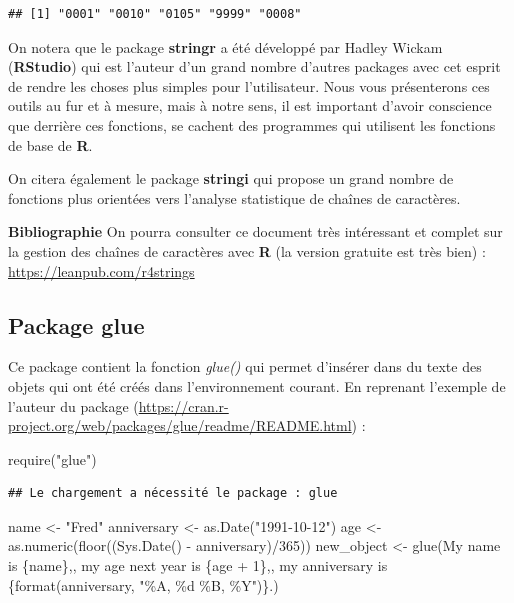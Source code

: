 \documentclass[
]{book}
\newenvironment{Shaded}{\begin{snugshade}}{\end{snugshade}}
\newcommand{\DecValTok}[1]{\textcolor[rgb]{0.00,0.00,0.81}{#1}}
\newcommand{\FunctionTok}[1]{\textcolor[rgb]{0.00,0.00,0.00}{#1}}
\newcommand{\NormalTok}[1]{#1}
\newcommand{\OtherTok}[1]{\textcolor[rgb]{0.56,0.35,0.01}{#1}}
\newcommand{\SpecialCharTok}[1]{\textcolor[rgb]{0.00,0.00,0.00}{#1}}
\newcommand{\StringTok}[1]{\textcolor[rgb]{0.31,0.60,0.02}{#1}}
\theoremstyle{definition}
\theoremstyle{definition}
\theoremstyle{definition}
\theoremstyle{definition}
\theoremstyle{remark}
\begin{document}
\begin{verbatim}
## [1] "0001" "0010" "0105" "9999" "0008"
\end{verbatim}

On notera que le package \textbf{stringr} a été développé par Hadley Wickam (\textbf{RStudio}) qui est l'auteur d'un grand nombre d'autres packages avec cet esprit de rendre les choses plus simples pour l'utilisateur. Nous vous présenterons ces outils au fur et à mesure, mais à notre sens, il est important d'avoir conscience que derrière ces fonctions, se cachent des programmes qui utilisent les fonctions de base de \textbf{R}.

On citera également le package \textbf{stringi} qui propose un grand nombre de fonctions plus orientées vers l'analyse statistique de chaînes de caractères.

\textbf{Bibliographie}
On pourra consulter ce document très intéressant et complet sur la gestion des chaînes de caractères avec \textbf{R} (la version gratuite est très bien) :
\url{https://leanpub.com/r4strings}

\hypertarget{package-glue}{%
\subsection{\texorpdfstring{Package \textbf{glue}}{Package glue}}\label{package-glue}}

Ce package contient la fonction \emph{glue()} qui permet d'insérer dans du texte des objets qui ont été créés dans l'environnement courant.
En reprenant l'exemple de l'auteur du package (\url{https://cran.r-project.org/web/packages/glue/readme/README.html}) :

\begin{Shaded}
\begin{Highlighting}[]
\FunctionTok{require}\NormalTok{(}\StringTok{"glue"}\NormalTok{)}
\end{Highlighting}
\end{Shaded}

\begin{verbatim}
## Le chargement a nécessité le package : glue
\end{verbatim}

\begin{Shaded}
\begin{Highlighting}[]
\NormalTok{name }\OtherTok{\textless{}{-}} \StringTok{"Fred"}
\NormalTok{anniversary }\OtherTok{\textless{}{-}} \FunctionTok{as.Date}\NormalTok{(}\StringTok{"1991{-}10{-}12"}\NormalTok{)}
\NormalTok{age }\OtherTok{\textless{}{-}} \FunctionTok{as.numeric}\NormalTok{(}\FunctionTok{floor}\NormalTok{((}\FunctionTok{Sys.Date}\NormalTok{() }\SpecialCharTok{{-}}\NormalTok{ anniversary)}\SpecialCharTok{/}\DecValTok{365}\NormalTok{))}
\NormalTok{new\_object }\OtherTok{\textless{}{-}} \FunctionTok{glue}\NormalTok{(}\StringTok{\textquotesingle{}My name is \{name\},\textquotesingle{}}\NormalTok{,}
  \StringTok{\textquotesingle{} my age next year is \{age + 1\},\textquotesingle{}}\NormalTok{,}
  \StringTok{\textquotesingle{} my anniversary is \{format(anniversary, "\%A, \%d \%B, \%Y")\}.\textquotesingle{}}\NormalTok{)}
\end{Highlighting}
\end{Shaded}
\end{document}
